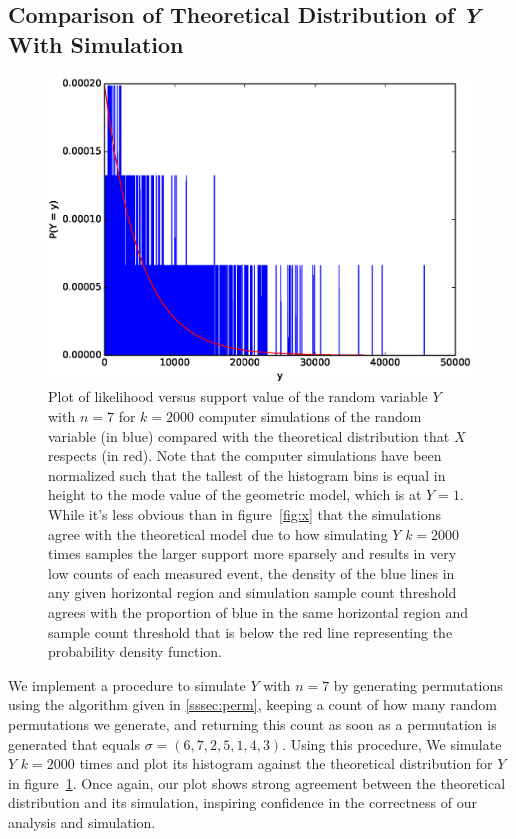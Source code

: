 \documentclass[11pt, oneside]{article}   	%
\begin{document}
\subsection{Comparison of Theoretical Distribution of \textit{Y} With Simulation}

\begin{figure}[H]
\includegraphics[scale=.5]{part_1_problem_5}
\caption{Plot of likelihood versus support value of the random variable $Y$ with $n = 7$ for $k = 2000$ computer simulations of the random variable (in blue) compared with the theoretical distribution that $X$ respects (in red). Note that the computer simulations have been normalized such that the tallest of the histogram bins is equal in height to the mode value of the geometric model, which is at $Y = 1$. While it's less obvious than in figure~\ref{fig:x} that the simulations agree with the theoretical model due to how simulating $Y$ $k = 2000$ times samples the larger support more sparsely and results in very low counts of each measured event, the density of the blue lines in any given horizontal region and simulation sample count threshold agrees with the proportion of blue in the same horizontal region and sample count threshold that is below the red line representing the probability density function.}
\label{fig:y}
\end{figure}

We implement a procedure to simulate $Y$ with $n = 7$ by generating permutations using the algorithm given in \ref{sssec:perm}, keeping a count of how many random permutations we generate, and returning this count as soon as a permutation is generated that equals $\sigma = (6, 7, 2, 5, 1, 4, 3)$. Using this procedure, We simulate $Y$ $k = 2000$ times and plot its histogram against the theoretical distribution for $Y$ in figure~\ref{fig:y}. Once again, our plot shows strong agreement between the theoretical distribution and its simulation, inspiring confidence in the correctness of our analysis and simulation.
\end{document}
